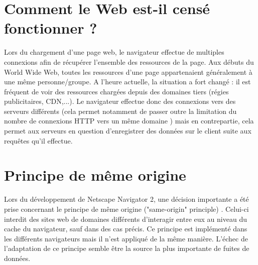 \section{Comment le Web est-il censé fonctionner ?}
Lors du chargement d'une page web, le navigateur effectue de multiples connexions afin de récupérer l'ensemble des ressources de la page. Aux débuts du World Wide Web, toutes les ressources d'une page appartenaient généralement à une même personne/groupe. A l'heure actuelle, la situation a fort changé : il est fréquent de voir des ressources chargées depuis des domaines tiers (régies publicitaires, CDN,...). Le navigateur effectue donc des connexions vers des serveurs différents (cela permet notamment de passer outre la limitation du nombre de connexions HTTP vers un même domaine \cite{IETF_RFC2616}) mais en contrepartie, cela permet aux serveurs en question d'enregistrer des données sur le client suite aux requêtes qu'il effectue.


\section{Principe de même origine}
Lors du développement de Netscape Navigator 2, une décision importante a été prise concernant le principe de même origine ("same-origin" principle) \cite{Jackson:2006:PBS:1135777.1135884}. Celui-ci interdit des sites web de domaines différents d'interagir entre eux au niveau du cache du navigateur, sauf dans des cas précis. Ce principe est implémenté dans les différents navigateurs mais il n'est appliqué de la même manière. L'échec de l'adaptation de ce principe semble être la source la plus importante de fuites de données.
